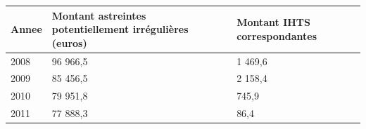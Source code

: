 \begin{longtable}[]{@{}lll@{}}
\toprule
\begin{minipage}[b]{0.07\columnwidth}\raggedright
Annee\strut
\end{minipage} & \begin{minipage}[b]{0.55\columnwidth}\raggedright
Montant astreintes potentiellement irrégulières (euros)\strut
\end{minipage} & \begin{minipage}[b]{0.29\columnwidth}\raggedright
Montant IHTS correspondantes\strut
\end{minipage}\tabularnewline
\midrule
\endhead
\begin{minipage}[t]{0.07\columnwidth}\raggedright
2008\strut
\end{minipage} & \begin{minipage}[t]{0.55\columnwidth}\raggedright
96 966,5\strut
\end{minipage} & \begin{minipage}[t]{0.29\columnwidth}\raggedright
1 469,6\strut
\end{minipage}\tabularnewline
\begin{minipage}[t]{0.07\columnwidth}\raggedright
2009\strut
\end{minipage} & \begin{minipage}[t]{0.55\columnwidth}\raggedright
85 456,5\strut
\end{minipage} & \begin{minipage}[t]{0.29\columnwidth}\raggedright
2 158,4\strut
\end{minipage}\tabularnewline
\begin{minipage}[t]{0.07\columnwidth}\raggedright
2010\strut
\end{minipage} & \begin{minipage}[t]{0.55\columnwidth}\raggedright
79 951,8\strut
\end{minipage} & \begin{minipage}[t]{0.29\columnwidth}\raggedright
745,9\strut
\end{minipage}\tabularnewline
\begin{minipage}[t]{0.07\columnwidth}\raggedright
2011\strut
\end{minipage} & \begin{minipage}[t]{0.55\columnwidth}\raggedright
77 888,3\strut
\end{minipage} & \begin{minipage}[t]{0.29\columnwidth}\raggedright
86,4\strut
\end{minipage}\tabularnewline

\end{longtable}
